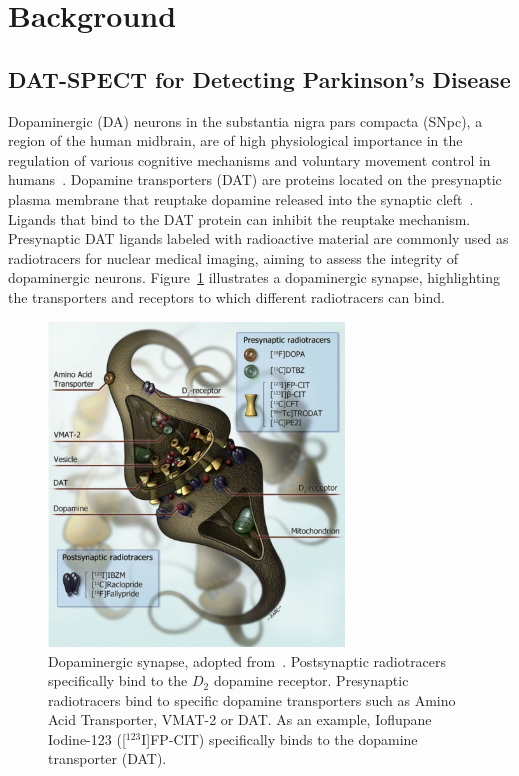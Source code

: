 \section{Background}
\label{sec:background}

\subsection{DAT-SPECT for Detecting Parkinson's Disease}
\label{subsec:datspect}


Dopaminergic (DA) neurons in the substantia nigra pars compacta (SNpc), a region of the human midbrain, 
are of high physiological importance in the regulation of various cognitive mechanisms 
and voluntary movement control in humans~\citep{Luo2016-zj}.
Dopamine transporters (DAT) are proteins located on the presynaptic plasma membrane 
that reuptake dopamine released into the synaptic cleft~\citep{Giros1993-xb}.
Ligands that bind to the DAT protein can inhibit the reuptake mechanism.
Presynaptic DAT ligands labeled with radioactive material are commonly used as radiotracers for nuclear medical imaging,
aiming to assess the integrity of dopaminergic neurons.
Figure~\ref{fig:dat_tracer_synapse} illustrates a dopaminergic synapse, 
highlighting the transporters and receptors to which different radiotracers can bind.

\begin{figure}[t]
  \centering
  \includegraphics[width=0.7\textwidth]{content/figures/da_synapse.png}
  \caption{Dopaminergic synapse, adopted from~\cite{Booij2008-hh}.
  Postsynaptic radiotracers specifically bind to the $D_2$ dopamine receptor. 
  Presynaptic radiotracers bind to specific dopamine transporters such as Amino Acid Transporter, VMAT-2 or DAT.
  As an example, Ioflupane Iodine-123 ([$^{123}$I]FP-CIT) specifically binds to the dopamine transporter (DAT).} 
  \label{fig:dat_tracer_synapse}
\end{figure}

